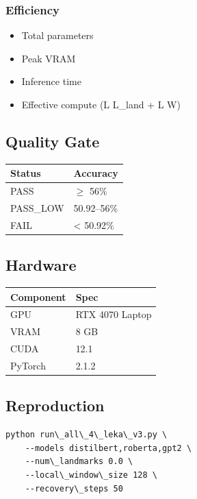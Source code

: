 \subsubsection{Efficiency}
\begin{itemize}
\item Total parameters
\item Peak VRAM
\item Inference time
\item Effective compute (L   L\_land + L   W)

\end{itemize}
\subsection{Quality Gate}

\begin{table}[H]
\centering
\small
\begin{tabular}{ll}
\toprule
\textbf{Status} & \textbf{Accuracy} \\
\midrule
PASS & $\ge$ 56\% \\
PASS\_LOW & 50.92--56\% \\
FAIL & \textless{} 50.92\% \\
\bottomrule
\end{tabular}
\end{table}

\subsection{Hardware}

\begin{table}[H]
\centering
\small
\begin{tabular}{ll}
\toprule
\textbf{Component} & \textbf{Spec} \\
\midrule
GPU & RTX 4070 Laptop \\
VRAM & 8 GB \\
CUDA & 12.1 \\
PyTorch & 2.1.2 \\
\bottomrule
\end{tabular}
\end{table}

\subsection{Reproduction}

\begin{lstlisting}
python run\_all\_4\_leka\_v3.py \
    --models distilbert,roberta,gpt2 \
    --num\_landmarks 0.0 \
    --local\_window\_size 128 \
    --recovery\_steps 50
\end{lstlisting}

